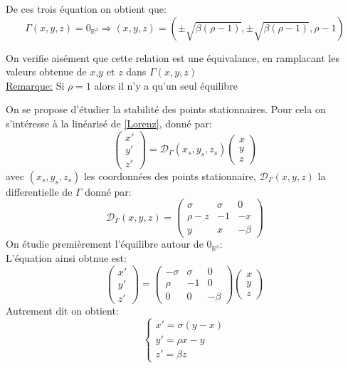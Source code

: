 \documentclass{article}
\newcommand*\colv[1]{
\left(\begin{array}{c}
    #1
\end{array}\right)
}
\newcommand{\R}{\mathbb{R}}
\begin{document}
De ces trois équation on obtient que:
\[
    \Gamma(x,y,z)=0_{\R^3} \Rightarrow (x,y,z) = (\pm \sqrt{ \beta (\rho -1)} ,\pm \sqrt{\beta (\rho -1)}, \rho -1)
\]

On verifie aisément que cette relation est une \'equivalance, en ramplacant les valeurs obtenue de $x$,$y$ et $z$ dans $\Gamma(x,y,z)$
\\
\underline{Remarque:} Si $\rho = 1$ alors il n'y a qu'un seul équilibre

On se propose d'étudier la stabilité des points stationnaires. Pour cela on s'intéresse à la linéarisé de \eqref{Lorenz}, donné par:
\[
\colv{x'\\y'\\z'} = \mathcal{D}_{\Gamma}(x_s,y_s,z_s)\colv{x\\y\\z}    
\]
avec $(x_s,y_s,z_s)$ les coordonnées des points stationnaire, $\mathcal{D}_{\Gamma}(x,y,z)$ la differentielle de $\Gamma$ donné par:
\[
\mathcal{D}_{\Gamma}(x,y,z) =
\begin{pmatrix}
    \sigma & \sigma & 0 \\ \rho - z & -1 & -x \\ y & x & - \beta
\end{pmatrix}
\]
On étudie premièrement l'équilibre autour de $0_{\R^3}$:\\
L'équation ainsi obtnue est:
\begin{equation}
    \colv{x'\\y'\\z'} =
    \begin{pmatrix}
        - \sigma & \sigma & 0 \\ \rho & -1 & 0 \\ 0 & 0 & - \beta
    \end{pmatrix}
    \colv{x \\ y \\ z}
\end{equation}
Autrement dit on obtient:
\begin{equation}
    \left\{\begin{array}{lr}
        x' = \sigma (y-x) \\
        y' = \rho x - y \\
        z' = \beta z
    \end{array}\right.
\end{equation}
\end{document}
